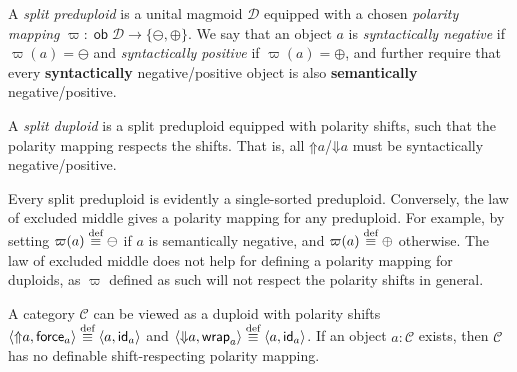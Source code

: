 \documentclass[runningheads]{llncs}
\newcommand*\rocqlogo{\usebox{\rocqlogobox}}
\newcommand{\lemmaref}[3]{\href{https://github.com/UniMath/UniMath/blob/94fae0eda57a778cec704bfa73b4ff525c9bc475/#1\#L#2?name=#3}{\rocqlogo}}
\newcommand{\acat}[1]{\mathcal{#1}}
\newcommand{\C}{\acat{C}}
\newcommand{\D}{\acat{D}}
\DeclareMathOperator{\ob}{\mathsf{ob}}
\newcommand{\id}{\mathsf{id}}
\newcommand{\defequiv}{\overset{\mathrm{\textup{def}}}{\equiv}}
\newcommand{\force}{\mathop{\mathsf{force}}\nolimits}
\newcommand{\wrap}{\mathop{\mathsf{wrap}}\nolimits}
\newcommand{\upshift}{\mathord{\Uparrow}}
\newcommand{\downshift}{\mathord{\Downarrow}}
\begin{document}
\begin{definition}[{\lemmaref{UniMath/CategoryTheory/Nonassociative/Duploids/Core.v}{191}{split\_preduploid}, \lemmaref{UniMath/CategoryTheory/Nonassociative/Duploids/Core.v}{461}{split\_duploid}}]
A \emph{split preduploid} is a unital magmoid \(\D\) equipped with a
chosen \emph{polarity mapping} \(\varpi \colon \ob\D \to \{\ominus,
\oplus\}\). We say that an object \(a\) is \emph{syntactically
negative} if \(\varpi(a) = \ominus\) and \emph{syntactically positive}
if \(\varpi(a) = \oplus\), and further require that every
\textbf{syntactically} negative/positive object is also \textbf{semantically}
negative/positive.

A \emph{split duploid} is a split preduploid equipped with polarity
shifts, such that the polarity mapping respects the shifts. That
is, all \(\upshift{a}\)/\(\downshift{a}\) must be syntactically
negative/positive.
\end{definition}

\begin{remark}
Every split preduploid is evidently a single\hyp{}sorted
preduploid. Conversely, the law of excluded middle gives a polarity
mapping for any preduploid. For example, by setting \(\varpi(a)
\defequiv \ominus\) if \(a\) is semantically negative, and \(\varpi(a)
\defequiv \oplus\) otherwise. The law of excluded middle does not help
for defining a polarity mapping for duploids, as \(\varpi\) defined
as such will not respect the polarity shifts in general.
\end{remark}

\begin{exampledef}
A category \(\C\) can be viewed as a duploid with polarity shifts
\(\langle\upshift a, \force_a\rangle \defequiv \langle a,
\id_a\rangle\) and \(\langle\downshift a, \wrap_a\rangle \defequiv
\langle a, \id_a\rangle\). If an object \(a : \C\) exists, then \(\C\)
has no definable shift\hyp{}respecting polarity mapping.
\end{exampledef}
\end{document}
